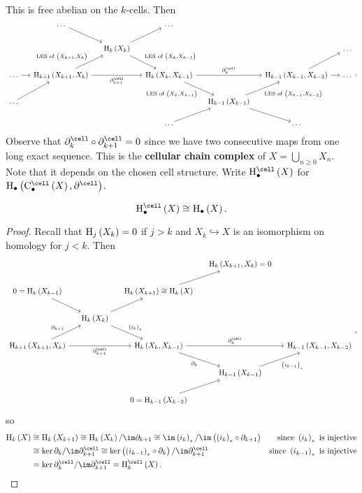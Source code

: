 This is free abelian on the $ k $-cells. Then
$$
\begin{tikzcd}[column sep=small]
& \dots \arrow{dr} & & \dots & & & \\
& & \H_k\br{X_k} \arrow{ur} \arrow{dr}{\text{LES of} \ \br{X_k, X_{k - 1}}} & & & & \dots \\
\dots \arrow{r} & \H_{k + 1}\br{X_{k + 1}, X_k} \arrow{ur}{\text{LES of} \ \br{X_{k + 1}, X_k}} \arrow{rr}[swap]{\da_{k + 1}^{\cell}} & & \H_k\br{X_k, X_{k - 1}} \arrow{rr}{\da_k^{\cell}} \arrow{dr}[swap]{\text{LES of} \ \br{X_k, X_{k - 1}}} & & \H_{k - 1}\br{X_{k - 1}, X_{k - 2}} \arrow{ur} \arrow{r} & \dots \\
\dots \arrow{ur} & & & & \H_{k - 1}\br{X_{k - 1}} \arrow{ur}[swap]{\text{LES of} \ \br{X_{k - 1}, X_{k - 2}}} \arrow{dr} & & \\
& & & \dots \arrow{ur} & & \dots &
\end{tikzcd}.
$$
Observe that $ \da_k^{\cell} \circ \da_{k + 1}^{\cell} = 0 $ since we have two consecutive maps from one long exact sequence. This is the \textbf{cellular chain complex} of $ X = \bigcup_{n \ge 0} X_n $. Note that it depends on the chosen cell structure. Write $ \H_\bullet^{\cell}\br{X} $ for $ \H_\bullet\br{\C_\bullet^{\cell}\br{X}, \da^{\cell}} $.

\pagebreak

\begin{proposition}
$$ \H_\bullet^{\cell}\br{X} \cong \H_\bullet\br{X}. $$
\end{proposition}

\begin{proof}
Recall that $ \H_j\br{X_k} = 0 $ if $ j > k $ and $ X_k \hookrightarrow X $ is an isomorphism on homology for $ j < k $. Then
$$
\begin{tikzcd}[column sep=small]
& & & \H_k\br{X_{k + 1}, X_k} = 0 & \\
0 = \H_k\br{X_{k - 1}} \arrow{dr} & & \H_k\br{X_{k + 1}} \cong \H_k\br{X} \arrow{ur} & & \\
& \H_k\br{X_k} \arrow{ur} \arrow{dr}{\br{i_k}_*} & & & \\
\H_{k + 1}\br{X_{k + 1}, X_k} \arrow{ur}{\da_{k + 1}} \arrow{rr}[swap]{\da_{k + 1}^{\cell}} & & \H_k\br{X_k, X_{k - 1}} \arrow{rr}{\da_k^{\cell}} \arrow{dr}[swap]{\da_k} & & \H_{k - 1}\br{X_{k - 1}, X_{k - 2}} \\
& & & \H_{k - 1}\br{X_{k - 1}} \arrow{ur}[swap]{\br{i_{k - 1}}_*} & \\
& & 0 = \H_{k - 1}\br{X_{k - 2}} \arrow{ur} & &
\end{tikzcd},
$$
so
\begin{align*}
\H_k\br{X}
& \cong \H_k\br{X_{k + 1}}
\cong \H_k\br{X_k} / \im \da_{k + 1}
\cong \im \br{i_k}_* / \im \br{\br{i_k}_* \circ \da_{k + 1}} & \text{since} \ \br{i_k}_* \ \text{is injective} \\
& \cong \ker \da_k / \im \da_{k + 1}^{\cell}
\cong \ker \br{\br{i_{k - 1}}_* \circ \da_k} / \im \da_{k + 1}^{\cell} & \text{since} \ \br{i_{k - 1}}_* \ \text{is injective} \\
& = \ker \da_k^{\cell} / \im \da_{k + 1}^{\cell}
= \H_k^{\cell}\br{X}.
\end{align*}
\end{proof}

